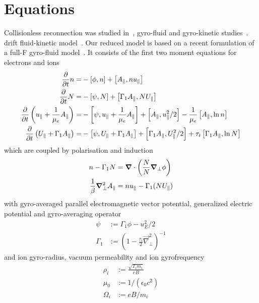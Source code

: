 \section{Equations}
Collisionless reconnection was studied in~\cite{stanier15}, gyro-fluid and gyro-kinetic studies~\cite{comisso13,zacharias14}. drift fluid-kinetic model~\cite{loureiro13}.
Our reduced model is based on a recent formulation of a full-F gyro-fluid model~\cite{Madsen2013}.
It consists of the first two moment equations for electrons and ions
\begin{align}
\frac{\partial}{\partial t} \ne =&
 - \left[\phi, \ne\right]
+ \left[\Apar,\ne \ue  \right]
\\
\label{firstgyromom}
\frac{\partial}{\partial t} \Ni =&
 - \left[\psi, \Ni\right]
+ \left[\Gamma_1 \Apar ,\Ni \Ui  \right]
 \\
\frac{\partial}{\partial t} \left( \ue+ \frac{1}{\mu_e} \Apar \right) =&
      -  \left[ \psi, \ue+ \frac{1}{\mu_e} \Apar  \right]%
    +   \left[\Apar,\ue^2/2   \right]%
      - \frac{1}{\mu_e}  \left[\Apar,\ln{\ne}   \right]
      \\
      \frac{\partial}{\partial t} \left( \Ui+ \Gamma_1 \Apar  \right) =&
      -  \left[ \psi, \Ui+ \Gamma_1 \Apar  \right]%
     +   \left[\Gamma_1 \Apar,\Ui^2/2   \right]%
      + \tau_i  \left[\Gamma_1 \Apar,\ln{\Ni}   \right]
\end{align}
which are coupled by polarisation and induction
\begin{align}
 n  - \Gamma_1 N &= {\boldsymbol{\nabla}}\cdot\left(\frac{N }{  N} {\boldsymbol{\nabla}}_\perp \phi\right) \\
 \frac{1}{\beta} {\boldsymbol{\nabla}}_\perp^2 A_\parallel &=  n  u_\parallel - \Gamma_1 (N U_\parallel)
\end{align}
with gyro-averaged parallel electromagnetic vector potential, generalized electric potential and gyro-averaging operator
\begin{align}
 \psi &:= \Gamma_1 \phi - u_E^2 /2  \\
  \Gamma_1 &:= (1-\frac{\tau_i}{2} \vec{\nabla}_\perp^2 )^{-1} 
\end{align}
and ion gyro-radius, vacuum permeability and ion gyrofrequency
\begin{align}
  \rho_{i}     &:= \frac{\sqrt{T_{i} m_i}}{e B} \\
  \mu_0 &:= 1/(\epsilon_0 c^2) \\
  \Omega_i &:= e B / m_i
\end{align}
